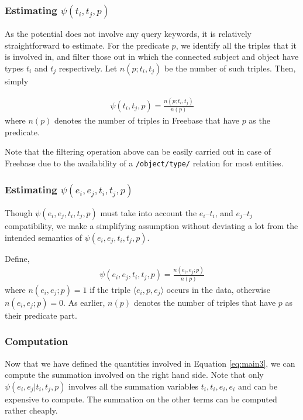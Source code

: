 \documentclass[a4paper, twoside, 12pt]{report}
\begin{document}
\subsubsection{Estimating $\psi(t_i,t_j,p)$}
As the potential does not involve any query keywords, it is relatively straightforward to estimate. For the predicate $p$, we identify all the triples that it is involved in, and filter those out  in which the connected subject and object have types $t_i$ and $t_j$ respectively. Let $n(p; t_i, t_j)$ be the number of such triples. Then, simply

\begin{align}
\psi(t_i,t_j,p) = \frac{n(p; t_i, t_j)}{n(p)}
\end{align}
where $n(p)$ denotes the number of triples in Freebase that have $p$ as the predicate.

Note that the filtering operation above can be easily carried out in case of Freebase due to the availability of a \texttt{/object/type/} relation for most entities.

\subsubsection{Estimating $\psi(e_i,e_j,t_i,t_j,p)$}
Though $\psi(e_i,e_j,t_i,t_j,p)$ must take into account the $e_i$--$t_i$, and $e_j$--$t_j$ compatibility, we make a simplifying assumption without deviating a lot from the intended semantics of $\psi(e_i,e_j,t_i,t_j,p)$.

Define,
\begin{align}
\psi(e_i,e_j,t_i,t_j,p) = \frac{n(e_i, e_j; p)}{n(p)} \label{eq:psi4}
\end{align}
where $n(e_i, e_j; p) = 1$ if the triple $\langle e_i, p, e_j \rangle$ occurs in the data, otherwise $n(e_i, e_j; p) = 0$. As earlier, $n(p)$ denotes the number of triples that have $p$ as their predicate part.

\subsubsection{Computation}
Now that we have defined the quantities involved in Equation \ref{eq:main3}, we can compute the summation involved on the right hand side. Note that only $\psi(e_i, e_j | t_i, t_j, p)$ involves all the summation variables $t_i, t_i, e_i, e_i$ and can be expensive to compute. The summation on the other terms can be computed rather cheaply.

\end{document}
